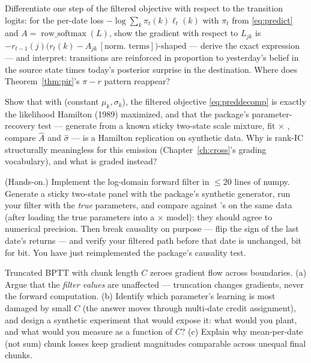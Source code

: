 \begin{exercise}\label{ex:7-gradA}
Differentiate one step of the filtered objective with respect to the
transition logits: for the per-date loss $-\log\sum_k \pi_t(k)\ell_t(k)$
with $\pi_t$ from \eqref{eq:predict} and $A = \operatorname{row\_softmax}
(L)$, show the gradient with respect to $L_{jk}$ is
$-r_{t-1}(j)\bigl(r_t(k) - A_{jk}\,[\text{norm.\ terms}]\bigr)$-shaped
--- derive the exact expression --- and interpret: transitions are
reinforced in proportion to yesterday's belief in the source state times
today's posterior surprise in the destination. Where does
Theorem~\ref{thm:pir}'s $\pi - r$ pattern reappear?
\end{exercise}

\begin{exercise}\label{ex:7-hamilton}
Show that with  (constant $\mu_k,
\sigma_k$), the filtered objective \eqref{eq:preddecomp} is exactly the
likelihood Hamilton (1989) maximized, and that the package's
parameter-recovery test --- generate from a known sticky two-state
scale mixture, fit  $\times$ , compare
$\hat A$ and $\hat\sigma$ --- is a Hamilton replication on synthetic
data. Why is rank-IC structurally meaningless for this emission
(Chapter~\ref{ch:cross}'s grading vocabulary), and what is graded
instead?
\end{exercise}

\begin{exercise}\label{ex:7-numpy}
(Hands-on.) Implement the log-domain forward filter in $\le 20$ lines of
numpy. Generate a sticky two-state panel with the package's synthetic
generator, run your filter with the \emph{true} parameters, and compare
against 's  on the
same data (after loading the true parameters into a
 $\times$  model): they should agree to
numerical precision. Then break causality on purpose --- flip the sign
of the last date's returns --- and verify your filtered path before
that date is unchanged, bit for bit. You have just reimplemented the
package's causality test.
\end{exercise}

\begin{exercise}\label{ex:7-chunk}
Truncated BPTT with chunk length $C$ zeroes gradient flow across
boundaries. (a) Argue that the \emph{filter values} are unaffected ---
truncation changes gradients, never the forward computation.
(b) Identify which parameter's learning is most damaged by small $C$
(the answer moves through multi-date credit assignment), and design a
synthetic experiment that would expose it: what would you plant, and
what would you measure as a function of $C$? (c) Explain why
mean-per-date (not sum) chunk losses keep gradient magnitudes comparable
across unequal final chunks.
\end{exercise}
